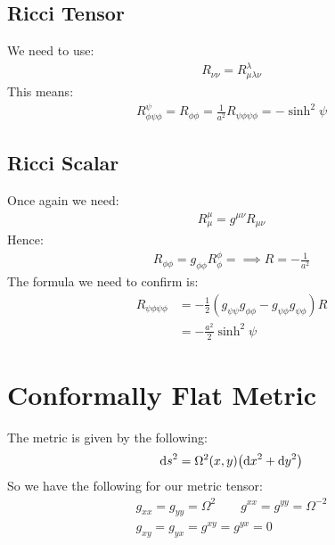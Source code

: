 \documentclass[12pt]{article}
\newcommand{\h}{\phi}
\newcommand{\s}{\psi}
\begin{document}
\subsection{Ricci Tensor}
We need to use:
\begin{align*}
  R_{\nu\nu}=R^\lambda_{\mu\lambda\nu}
\end{align*}
This means:
\begin{align*}
  R^\psi_{\h\s\h}=R_{\h\h}=\frac{1}{a^2}R_{\s\h\s\h}=\boxed{-\sinh^2\s}
\end{align*}
\subsection{Ricci Scalar}
Once again we need:
\begin{align*}
  R^\mu_\mu=g^{\mu\nu}R_{\mu\nu}
\end{align*}
Hence:
\begin{align*}
  R_{\h\h}=g_{\h\h}R^{\h}_\h=\implies \boxed{R=-\frac{1}{a^2}}
\end{align*}
The formula we need to confirm is:
\begin{align*}
  R_{\s\h\s\h}&=-\frac{1}{2}(g_{\s\s}g_{\h\h}-g_{\s\h}g_{\s\h})R\\
  &=-\frac{a^2}{2}\sinh^2\s
\end{align*}
\section{Conformally Flat Metric}
The metric is given by the following:
\begin{align*}
  \dd{s}^2=\Omega^2(x,y)\qty(\dd{x}^2+\dd{y}^2)
\end{align*}
So we have the following for our metric tensor:
\begin{gather*}
  g_{xx}=g_{yy}=\Omega^2\qquad g^{xx}=g^{yy}=\Omega^{-2}\\
  g_{xy}=g_{yx}=g^{xy}=g^{yx}=0
\end{gather*}
\end{document}
